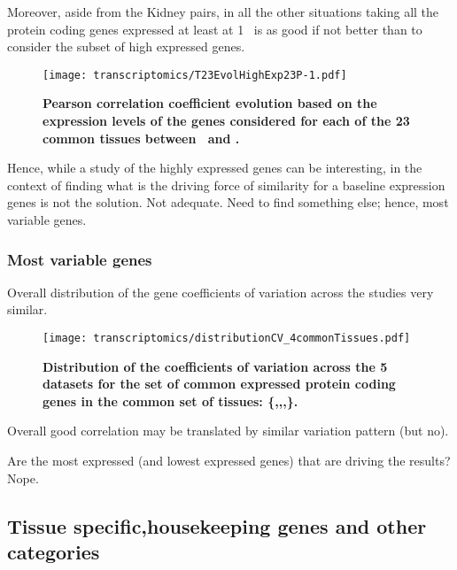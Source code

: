 Moreover, aside from the Kidney pairs, in all the other situations taking all the
protein coding genes expressed at least at  1 \FPKM\ is as good if not better than
to consider the subset of high expressed genes.

\begin{figure}[htpb]
    \texttt{[image: transcriptomics/T23EvolHighExp23P-1.pdf]}\centering
    \caption[Pearson correlation coefficient evolution based on the expression
    levels of the genes considered for each of the 23 common tissues]{%
\label{fig:CorHighExp23T}\textbf{Pearson correlation coefficient evolution based on the
expression levels of the genes considered for each of the 23 common tissues
between \uhlen\ and \gtex.}}
\end{figure}


Hence, while a study of the highly expressed genes can be interesting, in
the context of finding what is the driving force of similarity for a baseline
expression genes is not the solution. Not adequate.
Need to find something else; hence, most variable genes.


\subsubsection{Most variable genes}

Overall distribution of the gene coefficients of variation across the studies
very similar.

\begin{figure}[htpb]
    \texttt{[image: transcriptomics/distributionCV\_4commonTissues.pdf]}%
    \centering
    \caption[Coefficient of variation across the datasets for the set of common
expressed genes]{\label{fig:HistCV4T}\textbf{Distribution of the coefficients of
variation across the 5 datasets for the set of common expressed protein coding
genes in the common set of tissues:
\{,,,\}.}}
\end{figure}


Overall good correlation may be translated by similar variation pattern (but no).

Are the most expressed (and lowest expressed genes) that are driving the results? Nope.








\subsection{Tissue specific,housekeeping genes and other categories}\label{subsec:Trans_TissueSpeAndHK}

